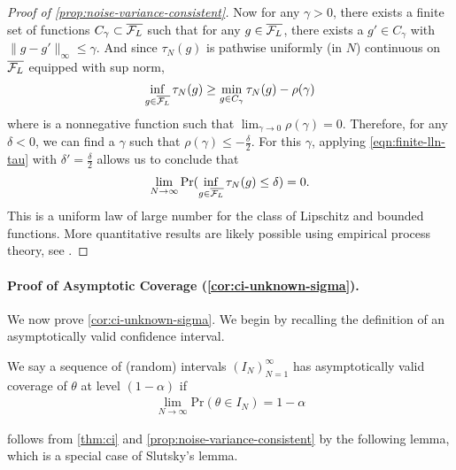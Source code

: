 \begin{proof}[Proof of \cref{prop:noise-variance-consistent}]
Now for any $\gamma >0$, there exists a finite set of functions $C_{\gamma} \subset \overline{\mathcal{F}_L}$ such that for any $g \in\overline{\mathcal{F}_L}$, there exists a $g' \in C_{\gamma}$ with $\|g - g'\|_{\infty} \leq \gamma$. And since $\tau_N(g)$ is pathwise uniformly (in $N$)  continuous on $\overline{\mathcal{F}_L}$ equipped with sup norm, 
\begin{align}\label{eqn:reduction-to-finite-case}
    \inf_{g \in \overline{\mathcal{F}_L}} \tau_N(g) \geq \min_{g \in C_\gamma} \tau_N(g) - \rho(\gamma)
\end{align}
where is a nonnegative function such that $\lim_{\gamma \to 0} \rho(\gamma) = 0$. Therefore, for any $\delta <0$, we can find a $\gamma$ such that $\rho(\gamma) \leq -\frac{\delta}{2}$. For this $\gamma$, applying \cref{eqn:finite-lln-tau} with $\delta' = \frac{\delta}{2}$ allows us to conclude that 
\begin{align}
    \lim_{N \to \infty} \mathrm{Pr}(\inf_{g \in \overline{\mathcal{F}_L}} \tau_N(g)  \leq \delta) =0.
\end{align}
This is a uniform law of large number for the class of Lipschitz and bounded functions. More quantitative results are likely possible using empirical process theory, see \citet[Chapter 5]{wainwright2019highdim}.
\end{proof}

\paragraph{Proof of Asymptotic Coverage (\cref{cor:ci-unknown-sigma}).}

We now prove \cref{cor:ci-unknown-sigma}. We begin by recalling the definition of an asymptotically valid confidence interval.
\begin{definition}
We say a sequence of (random) intervals $(I_N)_{N=1}^\infty$ has asymptotically valid coverage of $\theta$ at level $(1-\alpha)$ if 
\begin{align}
    \lim_{N \to \infty} \mathrm{Pr}(\theta \in I_N) = 1-\alpha
\end{align}
\end{definition}

 follows from \cref{thm:ci} and \cref{prop:noise-variance-consistent} by the following lemma, which is a special case of Slutsky's lemma.

